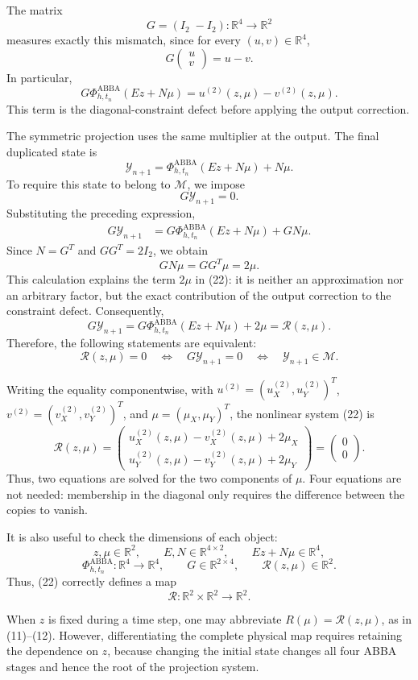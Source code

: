 \documentclass[11pt,a4paper]{article}
\newcommand{\R}{\mathbb{R}}
\newcommand{\Id}{I}
\newcommand{\Y}{\mathcal{Y}}
\newcommand{\M}{\mathcal{M}}
\newcommand{\PhiAB}{\Phi^{\mathrm{ABBA}}_{h,t_n}}
\begin{document}
The matrix
\[
 G=(\Id_2\; -\Id_2):\R^4\longrightarrow\R^2
\]
measures exactly this mismatch, since for every $(u,v)\in\R^4$,
\[
 G\begin{pmatrix}u\\v\end{pmatrix}=u-v.
\]
In particular,
\[
 G\PhiAB(Ez+N\mu)
 =u^{(2)}(z,\mu)-v^{(2)}(z,\mu).
\]
This term is the diagonal-constraint defect before applying the output correction.

The symmetric projection uses the same multiplier at the output. The final duplicated state is
\[
 \Y_{n+1}
 =\PhiAB(Ez+N\mu)+N\mu.
\]
To require this state to belong to $\M$, we impose
\[
 G\Y_{n+1}=0.
\]
Substituting the preceding expression,
\begin{align*}
 G\Y_{n+1}
 &=G\PhiAB(Ez+N\mu)+GN\mu.
\end{align*}
Since $N=G^T$ and $GG^T=2\Id_2$, we obtain
\[
 GN\mu=GG^T\mu=2\mu.
\]
This calculation explains the term $2\mu$ in (22): it is neither an approximation nor an
arbitrary factor, but the exact contribution of the output correction to the constraint
defect. Consequently,
\[
 G\Y_{n+1}
 =G\PhiAB(Ez+N\mu)+2\mu
 =\mathcal R(z,\mu).
\]
Therefore, the following statements are equivalent:
\[
 \boxed{
 \mathcal R(z,\mu)=0
 \quad\Longleftrightarrow\quad
 G\Y_{n+1}=0
 \quad\Longleftrightarrow\quad
 \Y_{n+1}\in\M.
 }
\]

Writing the equality componentwise, with
$u^{(2)}=(u_X^{(2)},u_Y^{(2)})^T$,
$v^{(2)}=(v_X^{(2)},v_Y^{(2)})^T$, and
$\mu=(\mu_X,\mu_Y)^T$, the nonlinear system (22) is
\[
 \mathcal R(z,\mu)=
 \begin{pmatrix}
  u_X^{(2)}(z,\mu)-v_X^{(2)}(z,\mu)+2\mu_X\\
  u_Y^{(2)}(z,\mu)-v_Y^{(2)}(z,\mu)+2\mu_Y
 \end{pmatrix}
 =\begin{pmatrix}0\\0\end{pmatrix}.
\]
Thus, two equations are solved for the two components of $\mu$. Four equations are not
needed: membership in the diagonal only requires the difference between the copies to vanish.

It is also useful to check the dimensions of each object:
\[
 z,\mu\in\R^2,
 \qquad
 E,N\in\R^{4\times2},
 \qquad
 Ez+N\mu\in\R^4,
\]
\[
 \PhiAB:\R^4\to\R^4,
 \qquad
 G\in\R^{2\times4},
 \qquad
 \mathcal R(z,\mu)\in\R^2.
\]
Thus, (22) correctly defines a map
\[
 \mathcal R:\R^2\times\R^2\longrightarrow\R^2.
\]

When $z$ is fixed during a time step, one may abbreviate
$R(\mu)=\mathcal R(z,\mu)$, as in (11)--(12). However, differentiating the complete
physical map requires retaining the dependence on $z$, because changing the initial state
changes all four ABBA stages and hence the root of the projection system.
\end{document}
